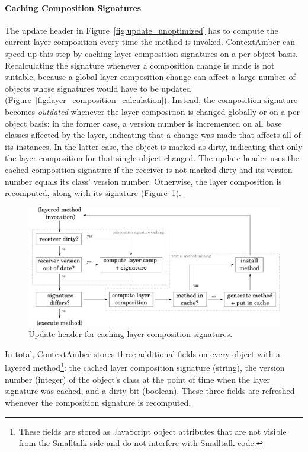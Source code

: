 \documentclass{sig-alternate}
\begin{document}
\paragraph{Caching Composition Signatures}
The update header in Figure~\ref{fig:update_unoptimized} has to compute the current layer composition every time the method is invoked. ContextAmber can speed up this step by caching layer composition signatures on a per-object basis. Recalculating the signature whenever a composition change is made is not suitable, because a global layer composition change can affect a large number of objects whose signatures would have to be updated (Figure~\ref{fig:layer_composition_calculation}). Instead, the composition signature becomes \emph{outdated} whenever the layer composition is changed globally or on a per-object basis: in the former case, a version number is incremented on all base classes affected by the layer, indicating that a change was made that affects all of its instances. In the latter case, the object is marked as dirty, indicating that only the layer composition for that single object changed. The update header uses the cached composition signature if the receiver is not marked dirty and its version number equals its class' version number. Otherwise, the layer composition is recomputed, along with its signature (Figure~\ref{fig:update_header_caching}).

\begin{figure}[!htp]
    \centering
    \includegraphics[width=\columnwidth]{update_header_class_wide.pdf}
    \caption{Update header for caching layer composition signatures.}
    \label{fig:update_header_caching}
\end{figure}

In total, ContextAmber stores three additional fields on every object with a layered method\footnote{These fields are stored as JavaScript object attributes that are not visible from the Smalltalk side and do not interfere with Smalltalk code.}: the cached layer composition signature (string), the version number (integer) of the object's class at the point of time when the layer signature was cached, and a dirty bit (boolean). These three fields are refreshed whenever the composition signature is recomputed.
\end{document}
